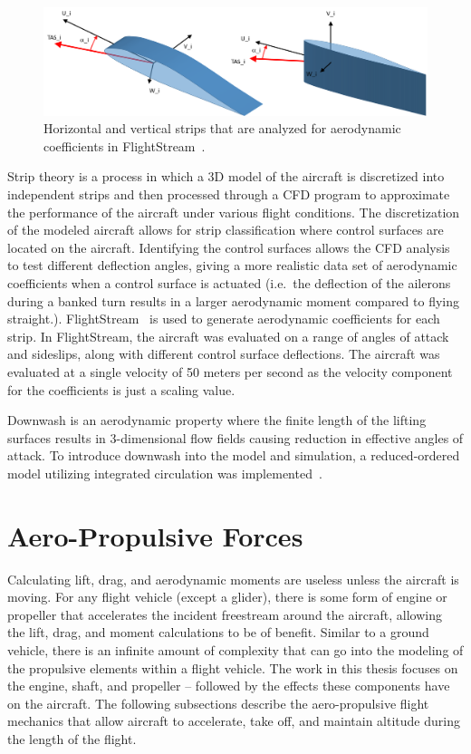 \begin{figure}[!ht]
    \centering
    \includegraphics[width=0.75\linewidth]{Figures/horvertstrips.png}
    \caption{Horizontal and vertical strips that are analyzed for aerodynamic coefficients in FlightStream~\cite{AerodynamicStripTheory2021}.}\label{fig:strips}
\end{figure}

Strip theory is a process in which a 3D model of the aircraft is discretized into independent strips and then processed through a CFD program to approximate the performance of the aircraft under various flight conditions. The discretization of the modeled aircraft allows for strip classification where control surfaces are located on the aircraft. Identifying the control surfaces allows the CFD analysis to test different deflection angles, giving a more realistic data set of aerodynamic coefficients when a control surface is actuated (i.e.\ the deflection of the ailerons during a banked turn results in a larger aerodynamic moment compared to flying straight.). FlightStream~\cite{FlightStream2022} is used to generate aerodynamic coefficients for each strip. In FlightStream, the aircraft was evaluated on a range of angles of attack and sideslips, along with different control surface deflections. The aircraft was evaluated at a single velocity of 50 meters per second as the velocity component for the coefficients is just a scaling value.

Downwash is an aerodynamic property where the finite length of the lifting surfaces results in 3-dimensional flow fields causing reduction in effective angles of attack. To introduce downwash into the model and simulation, a reduced-ordered model utilizing integrated circulation was implemented~\cite{ahujaIntegratedComputationalAeroacoustics2022,bhandariGeneticAlgorithmOptimization2023}\@.

\section{\textbf{Aero-Propulsive Forces}}

Calculating lift, drag, and aerodynamic moments are useless unless the aircraft is moving. For any flight vehicle (except a glider), there is some form of engine or propeller that accelerates the incident freestream around the aircraft, allowing the lift, drag, and moment calculations to be of benefit. Similar to a ground vehicle, there is an infinite amount of complexity that can go into the modeling of the propulsive elements within a flight vehicle. The work in this thesis focuses on the engine, shaft, and propeller {--} followed by the effects these components have on the aircraft. The following subsections describe the aero-propulsive flight mechanics that allow aircraft to accelerate, take off, and maintain altitude during the length of the flight.

